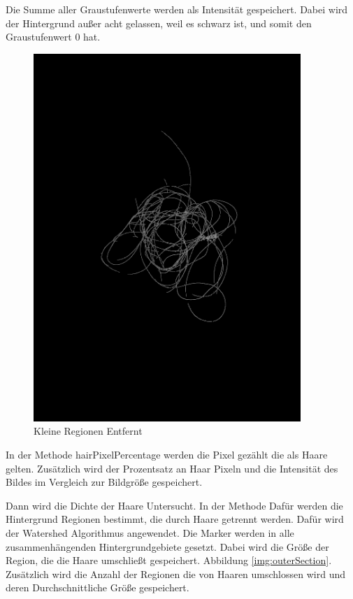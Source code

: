 \documentclass[german,a4paper,12pt]{llncs}
\begin{document}
Die Summe aller Graustufenwerte werden als Intensität gespeichert. Dabei wird der Hintergrund außer acht gelassen, weil es schwarz ist, und somit den Graustufenwert 0 hat.

\begin{figure}
	\centering
	\includegraphics[width=0.9\textwidth]{fig64/06small regions removed.png}
	\caption[]{Kleine Regionen Entfernt}
	\label{img:smallRegions}
\end{figure}

In der Methode hairPixelPercentage werden die Pixel gezählt die als Haare gelten. Zusätzlich wird der Prozentsatz an Haar Pixeln und die Intensität des Bildes im Vergleich zur Bildgröße gespeichert. 

Dann wird die Dichte der Haare Untersucht. In der Methode 
Dafür werden die Hintergrund Regionen bestimmt, die durch Haare getrennt werden. Dafür wird der Watershed Algorithmus angewendet.
Die Marker werden in alle zusammenhängenden Hintergrundgebiete gesetzt.
Dabei wird die Größe der Region, die die Haare umschließt gespeichert. Abbildung \ref{img:outerSection}.
Zusätzlich wird die Anzahl der Regionen die von Haaren umschlossen wird und deren Durchschnittliche Größe gespeichert.
\end{document}
